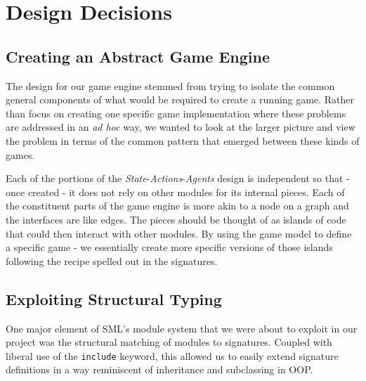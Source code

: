 \documentclass[9pt,letterpaper]{extarticle}
\begin{document}
	\section{Design Decisions}

  \subsection{Creating an Abstract Game Engine}
  The design for our game engine stemmed from trying to isolate the common
  general components of what would be required to create a running game.
  Rather than focus on creating one specific game implementation where these
  problems are addressed in an \textit{ad hoc} way, we wanted to
  look at the larger picture and view the problem in terms of the common pattern
  that emerged between these kinds of games.
  
  Each of the portions of the \textit{State}-\textit{Actions}-\textit{Agents}
  design is independent so that - once created - it does not rely on other
  modules for its internal pieces.
  Each of the constituent parts of the game engine is more akin to a node on a
  graph and the interfaces are like edges.
  The pieces should be thought of as islands of code that could then interact
  with other modules. By using the game model to define a specific game - we
  essentially create more specific versions of those islands following the
  recipe spelled out in the signatures.

\subsection{Exploiting Structural Typing}
  One major element of SML's module system that we were about to exploit in our project was
  the structural matching of modules to signatures. Coupled with liberal use of the \texttt{include}
  keyword, this allowed us to easily extend signature definitions in a way reminiscent of inheritance
  and subclassing in OOP.
  
\end{document}
